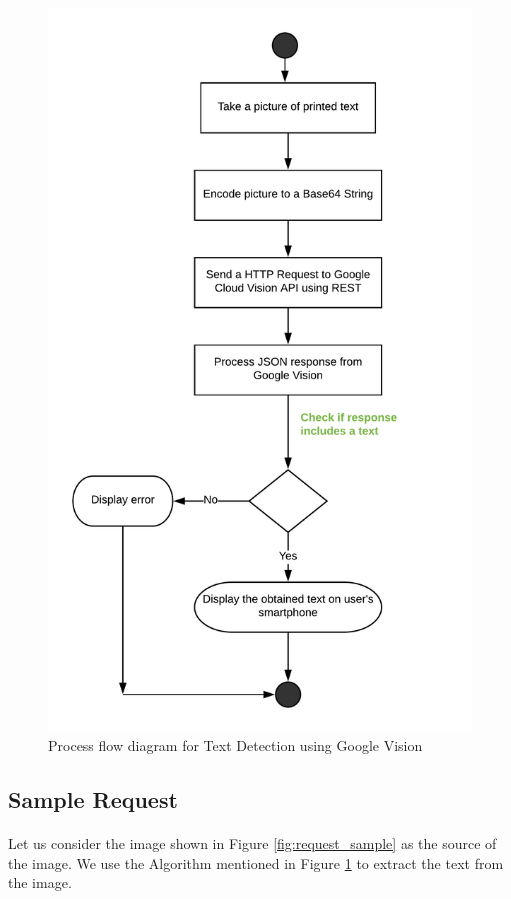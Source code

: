 \documentclass[12pt]{article}
\begin{document}
\begin{figure}[H]
	\centering
	\includegraphics[width=0.75\linewidth]{media/VISION_API.png}
	\caption{Process flow diagram for Text Detection using Google Vision}
	\label{fig:vision}
\end{figure} 

\subsection{Sample Request}

\paragraph{}Let us consider the image shown in Figure \ref{fig:request_sample} as the source of the image. We use the Algorithm mentioned in Figure \ref{fig:vision} to extract the text from the image.
\end{document}

